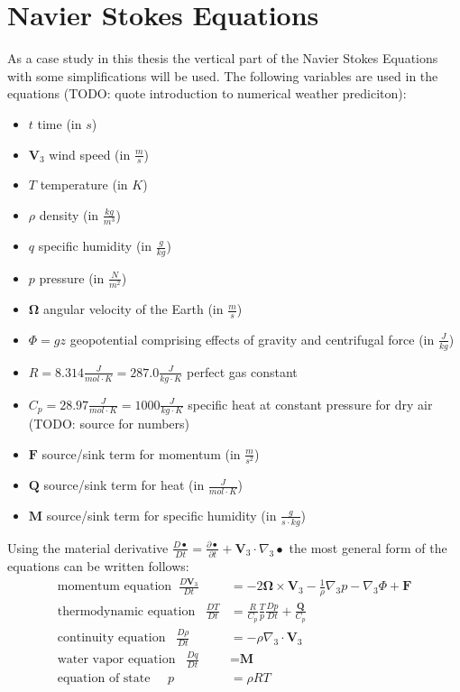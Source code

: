 \chapter{Navier Stokes Equations}\label{chapter:navier_stokes}
As a case study in this thesis the vertical part of the Navier Stokes Equations with some simplifications will be used.
The following variables are used in the equations (TODO: quote introduction to numerical weather prediciton):
\begin{itemize}
\item $t$ time (in $s$)
\item $\textbf{V}_3$ wind speed (in $\frac{m}{s}$)
\item $T$ temperature (in $K$)
\item $\rho$ density (in $\frac{kg}{m^3}$)
\item $q$ specific humidity (in $\frac{g}{kg}$)
\item $p$ pressure (in $\frac{N}{m^2}$)
\item $\boldsymbol{\Omega}$ angular velocity of the Earth (in $\frac{m}{s}$)
\item $\Phi = gz$ geopotential comprising effects of gravity and centrifugal force (in $\frac{J}{kg}$)
\item $R=8.314\frac{J}{mol\cdot K} = 287.0 \frac{J}{kg\cdot K}$ perfect gas constant
\item $C_p=28.97 \frac{J}{mol\cdot K} = 1000 \frac{J}{kg\cdot K}$ specific heat at constant pressure for dry air (TODO: source for numbers)
\item $\textbf{F}$ source/sink term for momentum (in $\frac{m}{s^2}$)
\item $\textbf{Q}$ source/sink term for heat (in $\frac{J}{mol\cdot K}$)
\item $\textbf{M}$ source/sink term for specific humidity (in $\frac{g}{s\cdot kg}$)
\end{itemize}
Using the material derivative $\frac{D\bullet}{Dt}=\frac{\partial\bullet}{\partial t}+\textbf{V}_3\cdot \nabla_3\bullet$ the most general form of the equations can be written follows:
\begin{align}
\text{momentum equation}\;\; \frac{D\textbf{V}_3}{Dt} &= -2\boldsymbol{\Omega}\times \textbf{V}_3 - \frac{1}{\rho}\nabla _3 p - \nabla _3 \Phi + \textbf{F} \label{eq_mom}\\
\text{thermodynamic equation}\;\;\; \frac{DT}{Dt} &= \frac{R}{C_p}\frac{T}{p}\frac{Dp}{Dt}+\frac{\textbf{Q}}{C_p}\label{eq_therm}\\
\text{continuity equation}\;\;\; \frac{D\rho}{Dt} &= -\rho \nabla _3 \cdot \textbf{V}_3\label{eq_cont}\\
\text{water vapor equation}\;\;\; \frac{Dq}{Dt} &= \textbf{M}\label{eq_water}\\
\text{equation of state}\;\;\;\;\; p &= \rho R T \label{eq_state}
\end{align}
